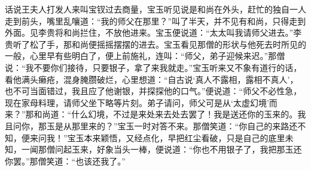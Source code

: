 


\begin{parag}
    话说王夫人打发人来叫宝钗过去商量，宝玉听见说是和尚在外头，赶忙的独自一人走到前头，嘴里乱嚷道：“我的师父在那里？”叫了半天，并不见有和尚，只得走到外面。见李贵将和尚拦住，不放他进来。宝玉便说道：“太太叫我请师父进去。”李贵听了松了手，那和尚便摇摇摆摆的进去。宝玉看见那僧的形状与他死去时所见的一般，心里早有些明白了，便上前施礼，连叫：“师父，弟子迎候来迟。”那僧说：“我不要你们接待，只要银子，拿了来我就走。”宝玉听来又不象有道行的话，看他满头癞疮，混身腌臜破烂，心里想道：“自古说‘真人不露相，露相不真人’，也不可当面错过，我且应了他谢银，并探探他的口气。”便说道：“师父不必性急，现在家母料理，请师父坐下略等片刻。弟子请问，师父可是从‘太虚幻境’而来？”那和尚道：“什么幻境，不过是来处来去处去罢了！我是送还你的玉来的。我且问你，那玉是从那里来的？”宝玉一时对答不来。那僧笑道：“你自己的来路还不知，便来问我！”宝玉本来颖悟，又经点化，早把红尘看破，只是自己的底里未知，一闻那僧问起玉来，好象当头一棒，便说道：“你也不用银子了，我把那玉还你罢。”那僧笑道：“也该还我了。”
\end{parag}


